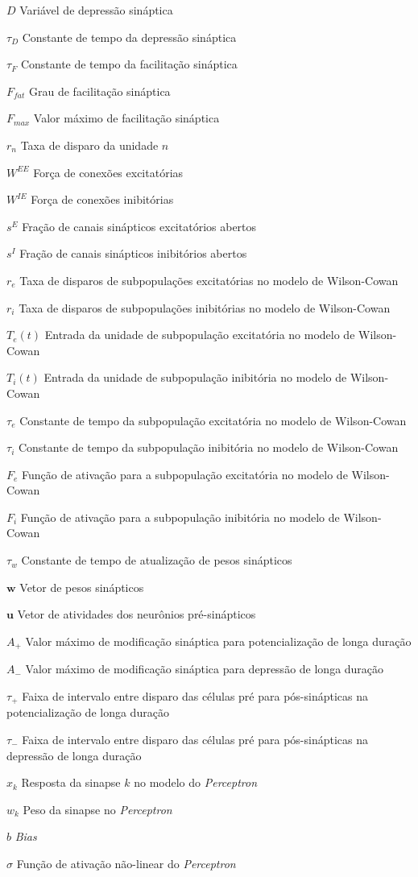 \documentclass[
	12pt,				%
	openright,			%
	oneside,			%
	a4paper,			%
	chapter=TITLE,		%
	english,			%
	french,				%
	spanish,			%
	brazil				%
	]{abntex2}
\theoremstyle{definition}
\begin{document}
\begin{simbolos}
\item[$D$] Variável de depressão sináptica
\item[$\tau_D$] Constante de tempo da depressão sináptica
\item[$\tau_F$] Constante de tempo da facilitação sináptica
\item[$F_{fat}$] Grau de facilitação sináptica
\item[$F_{max}$] Valor máximo de facilitação sináptica
\item[$r_n$] Taxa de disparo da unidade $n$
\item[$W^{EE}$] Força de conexões excitatórias
\item[$W^{IE}$] Força de conexões inibitórias
\item[$s^E$] Fração de canais sinápticos excitatórios abertos
\item[$s^I$] Fração de canais sinápticos inibitórios abertos
\item[$r_e$] Taxa de disparos de subpopulações excitatórias no modelo de Wilson-Cowan
\item[$r_i$] Taxa de disparos de subpopulações inibitórias no modelo de Wilson-Cowan
\item[$T_e(t)$] Entrada da unidade de subpopulação excitatória no modelo de Wilson-Cowan
\item[$T_i(t)$] Entrada da unidade de subpopulação inibitória no modelo de Wilson-Cowan
\item[$\tau_e$] Constante de tempo da subpopulação excitatória no modelo de Wilson-Cowan
\item[$\tau_i$] Constante de tempo da subpopulação inibitória no modelo de Wilson-Cowan
\item[$F_e$] Função de ativação para a subpopulação excitatória no modelo de Wilson-Cowan
\item[$F_i$] Função de ativação para a subpopulação inibitória no modelo de Wilson-Cowan
\item[$\tau_w$] Constante de tempo de atualização de pesos sinápticos
\item[$\mathbf{w}$] Vetor de pesos sinápticos
\item[$\mathbf{u}$] Vetor de atividades dos neurônios pré-sinápticos
\item[$A_+$] Valor máximo de modificação sináptica para potencialização de longa duração
\item[$A_-$] Valor máximo de modificação sináptica para depressão de longa duração
\item[$\tau_+$] Faixa de intervalo entre disparo das células pré para pós-sinápticas na potencialização de longa duração
\item[$\tau_-$] Faixa de intervalo entre disparo das células pré para pós-sinápticas na depressão de longa duração
\item[$x_k$] Resposta da sinapse $k$ no modelo do \textit{Perceptron}
\item[$w_k$] Peso da sinapse no \textit{Perceptron}
\item[$b$] \textit{Bias}
\item[$\sigma$] Função de ativação não-linear do \textit{Perceptron}
\end{simbolos}
\end{document}
